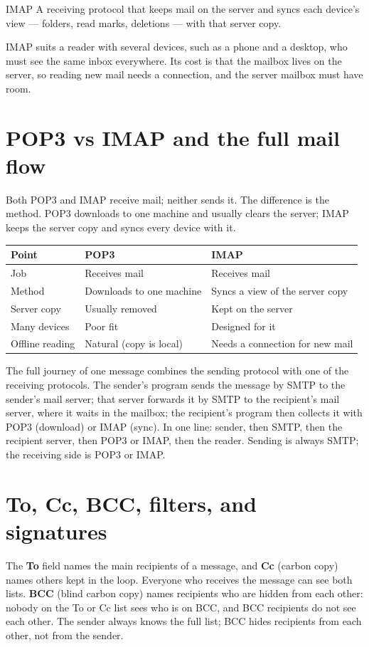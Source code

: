 \begin{definitionbox}{IMAP}
A receiving protocol that keeps mail on the server and syncs each device's
view --- folders, read marks, deletions --- with that server copy.
\end{definitionbox}

IMAP suits a reader with several devices, such as a phone and a desktop,
who must see the same inbox everywhere. Its cost is that the mailbox lives
on the server, so reading new mail needs a connection, and the server
mailbox must have room.

\section{POP3 vs IMAP and the full mail flow}
Both POP3 and IMAP receive mail; neither sends it. The difference is the
method. POP3 downloads to one machine and usually clears the server; IMAP
keeps the server copy and syncs every device with it.

\begin{center}
\begin{tabular}{p{}p{}p{}}
\toprule
\textbf{Point} & \textbf{POP3} & \textbf{IMAP} \\
\midrule
Job & Receives mail & Receives mail \\
Method & Downloads to one machine & Syncs a view of the server copy \\
Server copy & Usually removed & Kept on the server \\
Many devices & Poor fit & Designed for it \\
Offline reading & Natural (copy is local) & Needs a connection for new mail \\
\bottomrule
\end{tabular}
\end{center}

The full journey of one message combines the sending protocol with one of
the receiving protocols. The sender's program sends the message by SMTP to
the sender's mail server; that server forwards it by SMTP to the
recipient's mail server, where it waits in the mailbox; the recipient's
program then collects it with POP3 (download) or IMAP (sync). In one line:
sender, then SMTP, then the recipient server, then POP3 or IMAP, then the
reader. Sending is always SMTP; the receiving side is POP3 or IMAP.

\section{To, Cc, BCC, filters, and signatures}
The \textbf{To} field names the main recipients of a message, and
\textbf{Cc} (carbon copy) names others kept in the loop. Everyone who
receives the message can see both lists. \textbf{BCC} (blind carbon copy)
names recipients who are hidden from each other: nobody on the To or Cc
list sees who is on BCC, and BCC recipients do not see each other. The
sender always knows the full list; BCC hides recipients from each other,
not from the sender.

